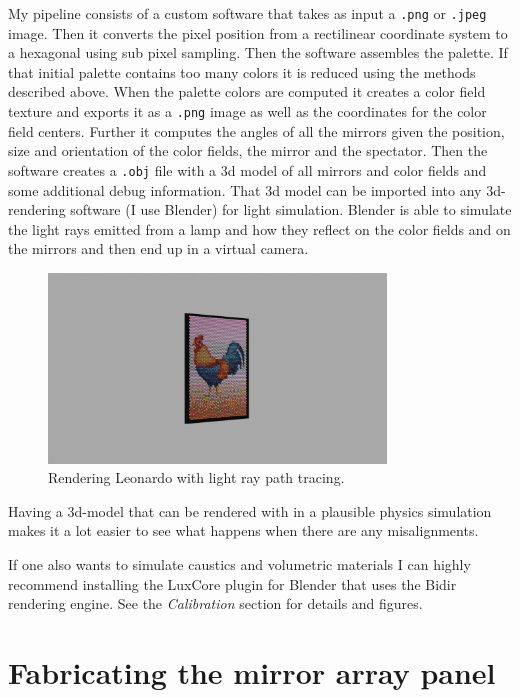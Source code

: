 \documentclass{article}
\begin{document}
My pipeline consists of a custom software that takes as input a
\texttt{.png} or \texttt{.jpeg} image. Then it converts the pixel
position from a rectilinear coordinate system to a hexagonal using sub
pixel sampling. Then the software assembles the palette. If that initial
palette contains too many colors it is reduced using the methods
described above. When the palette colors are computed it creates a
color field texture and exports it as a \texttt{.png} image as well as
the coordinates for the color field centers. Further it computes the
angles of all the mirrors given the position, size and orientation of
the color fields, the mirror and the spectator. Then the software
creates a \texttt{.obj} file with a 3d model of all mirrors and color
fields and some additional debug information. That 3d model can be
imported into any 3d-rendering software (I use Blender) for light
simulation. Blender is able to simulate the light rays emitted from a
lamp and how they reflect on the color fields and on the mirrors and
then end up in a virtual camera.

\begin{figure}[ht!]
\centering
\includegraphics[width=0.8\textwidth]{images/simulation/rooster.png}
\caption{Rendering Leonardo with light ray path tracing.}
\end{figure}

Having a 3d-model that can be rendered with in a plausible physics
simulation makes it a lot easier to see what happens when there are any
misalignments.

If one also wants to simulate caustics and volumetric materials I can
highly recommend installing the LuxCore plugin for Blender that uses
the Bidir rendering engine. See the \emph{Calibration} section for
details and figures.


\section{Fabricating the mirror array panel}
\end{document}

